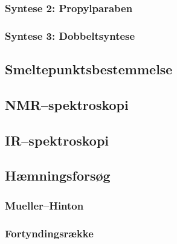     \subsubsection{Syntese 2: Propylparaben}
    

    \subsubsection{Syntese 3: Dobbeltsyntese}
        

    \subsection{Smeltepunktsbestemmelse}
    

    \subsection{NMR--spektroskopi}
    

    \subsection{IR--spektroskopi}
    

    \subsection{Hæmningsforsøg}
    

    \subsubsection{Mueller--Hinton}
    

    \subsubsection{Fortyndingsrække}
